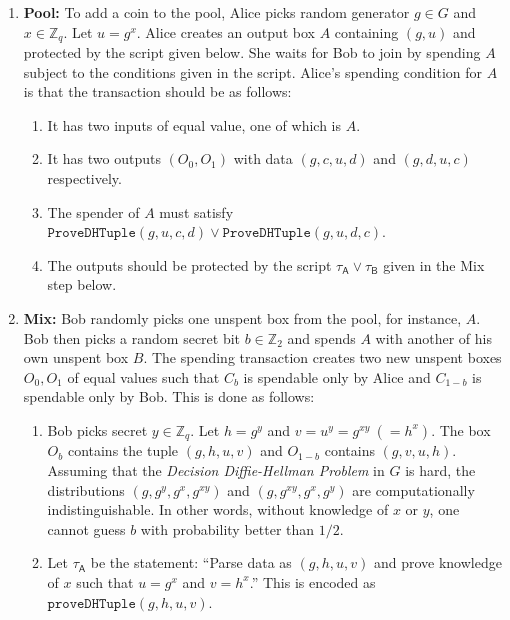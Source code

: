 \documentclass[11pt]{article}
\begin{document}
\begin{enumerate}
	\item \textbf{Pool:} To add a coin to the pool, Alice picks random generator $g\in G$ and $x\in \mathbb{Z}_q$. Let $u = g^{x}$. Alice creates an output box $A$ containing $(g, u)$ and protected by the script given below. She waits for Bob to join by spending $A$ subject to the conditions given in the script. 
Alice's spending condition for $A$ is that the transaction should be as follows: 
	
	\begin{enumerate}
		\item It has two inputs of equal value, one of which is $A$. %
		\item It has two outputs $(O_0, O_1)$ with data $(g, c, u, d)$ and $(g, d, u, c)$ respectively.
		\item The spender of $A$ must satisfy $\texttt{ProveDHTuple}(g, u, c, d)\lor \texttt{ProveDHTuple}(g, u, d, c)$.
		\item The outputs should be protected by the script $\tau_\textsf{A} \lor \tau_\textsf{B}$ given in the Mix step below.
	\end{enumerate}
	
	
	\item \textbf{Mix:} Bob randomly picks one unspent box from the pool, for instance, $A$. Bob then picks a random secret bit $b \in \mathbb{Z}_2$ and spends $A$ with another of his own unspent box $B$. The spending transaction creates two new unspent boxes $O_0, O_1$ of equal values such that $C_b$ is spendable only by Alice and $C_{1-b}$ is spendable only by Bob. This is done as follows:
	
	\begin{enumerate}
		
		\item Bob picks secret $y\in \mathbb{Z}_q$. Let $h = {g}^{y}$ and $v = {u}^{y} = {g}^{xy}~(={h}^{x})$.  %
		The box $O_b$ contains the tuple $(g, h, u, v)$ and $O_{1-b}$ contains $(g, v, u, h)$. Assuming that the {\em Decision Diffie-Hellman Problem} in $G$ is hard, the distributions $(g, {g}^{y}, {g}^{x}, {g}^{xy})$ and 
		$(g, {g}^{xy}, {g}^{x}, {g}^{y})$ are computationally indistinguishable. In other words, without knowledge of $x$ or $y$, one cannot guess $b$ with probability better than $1/2$.
		\item  Let 
		$\tau_\textsf{A}$ be the statement: ``Parse data as $(g, h, u, v)$ and
		prove knowledge of $x$ such that $u = {g}^{x}$ and ${v} = {h}^{x}$.'' This is encoded as $\texttt{proveDHTuple}(g, h, u, v)$.
		

\end{enumerate}
\end{enumerate}
\end{document}
